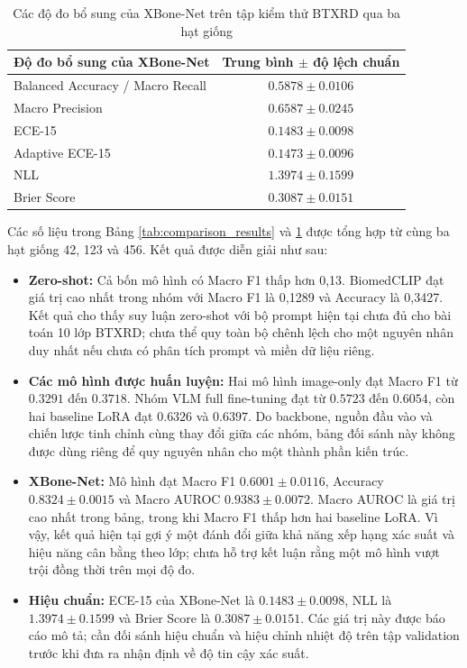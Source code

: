 \begin{table}[htbp]
\centering
\small
\begin{tabular}{|l|c|}
\hline
\textbf{Độ đo bổ sung của XBone-Net} & \textbf{Trung bình $\pm$ độ lệch chuẩn} \\ \hline
Balanced Accuracy / Macro Recall & $0{.}5878\pm0{.}0106$ \\ \hline
Macro Precision & $0{.}6587\pm0{.}0245$ \\ \hline
ECE-15 & $0{.}1483\pm0{.}0098$ \\ \hline
Adaptive ECE-15 & $0{.}1473\pm0{.}0096$ \\ \hline
NLL & $1{.}3974\pm0{.}1599$ \\ \hline
Brier Score & $0{.}3087\pm0{.}0151$ \\ \hline
\end{tabular}
\caption{Các độ đo bổ sung của XBone-Net trên tập kiểm thử BTXRD qua ba hạt giống}
\label{tab:xbone_additional_metrics}
\end{table}

Các số liệu trong Bảng \ref{tab:comparison_results} và
\ref{tab:xbone_additional_metrics} được tổng hợp từ cùng ba hạt giống 42, 123 và 456.
Kết quả được diễn giải như sau:
\begin{itemize}
    \item \textbf{Zero-shot:} Cả bốn mô hình có Macro F1 thấp hơn 0,13. BiomedCLIP đạt giá trị cao nhất trong nhóm với Macro F1 là 0,1289 và Accuracy là 0,3427. Kết quả cho thấy suy luận zero-shot với bộ prompt hiện tại chưa đủ cho bài toán 10 lớp BTXRD; chưa thể quy toàn bộ chênh lệch cho một nguyên nhân duy nhất nếu chưa có phân tích prompt và miền dữ liệu riêng.
    \item \textbf{Các mô hình được huấn luyện:} Hai mô hình image-only đạt Macro F1 từ $0{.}3291$ đến $0{.}3718$. Nhóm VLM full fine-tuning đạt từ $0{.}5723$ đến $0{.}6054$, còn hai baseline LoRA đạt $0{.}6326$ và $0{.}6397$. Do backbone, nguồn đầu vào và chiến lược tinh chỉnh cùng thay đổi giữa các nhóm, bảng đối sánh này không được dùng riêng để quy nguyên nhân cho một thành phần kiến trúc.
    \item \textbf{XBone-Net:} Mô hình đạt Macro F1 $0{.}6001\pm0{.}0116$, Accuracy $0{.}8324\pm0{.}0015$ và Macro AUROC $0{.}9383\pm0{.}0072$. Macro AUROC là giá trị cao nhất trong bảng, trong khi Macro F1 thấp hơn hai baseline LoRA. Vì vậy, kết quả hiện tại gợi ý một đánh đổi giữa khả năng xếp hạng xác suất và hiệu năng cân bằng theo lớp; chưa hỗ trợ kết luận rằng một mô hình vượt trội đồng thời trên mọi độ đo.
    \item \textbf{Hiệu chuẩn:} ECE-15 của XBone-Net là $0{.}1483\pm0{.}0098$, NLL là $1{.}3974\pm0{.}1599$ và Brier Score là $0{.}3087\pm0{.}0151$. Các giá trị này được báo cáo mô tả; cần đối sánh hiệu chuẩn và hiệu chỉnh nhiệt độ trên tập validation trước khi đưa ra nhận định về độ tin cậy xác suất.
\end{itemize}

